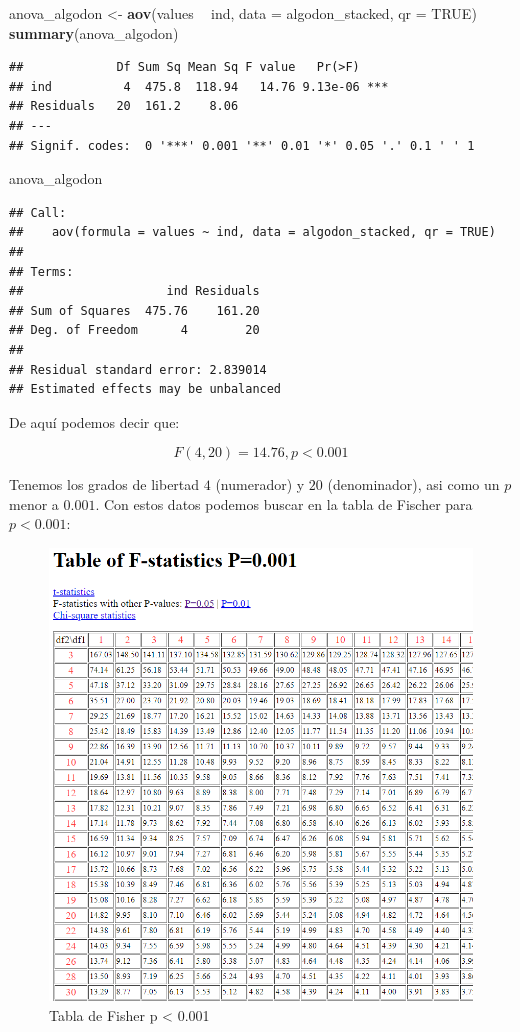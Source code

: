 \documentclass[]{article}
\newenvironment{Shaded}{\begin{snugshade}}{\end{snugshade}}
\newcommand{\KeywordTok}[1]{\textcolor[rgb]{0.13,0.29,0.53}{\textbf{#1}}}
\newcommand{\DataTypeTok}[1]{\textcolor[rgb]{0.13,0.29,0.53}{#1}}
\newcommand{\StringTok}[1]{\textcolor[rgb]{0.31,0.60,0.02}{#1}}
\newcommand{\OtherTok}[1]{\textcolor[rgb]{0.56,0.35,0.01}{#1}}
\newcommand{\OperatorTok}[1]{\textcolor[rgb]{0.81,0.36,0.00}{\textbf{#1}}}
\newcommand{\NormalTok}[1]{#1}
\begin{document}
\begin{Shaded}
\begin{Highlighting}[]
\NormalTok{anova_algodon <-}\StringTok{ }\KeywordTok{aov}\NormalTok{(values }\OperatorTok{~}\StringTok{ }\NormalTok{ind, }\DataTypeTok{data =}\NormalTok{ algodon_stacked, }\DataTypeTok{qr =} \OtherTok{TRUE}\NormalTok{)}
\KeywordTok{summary}\NormalTok{(anova_algodon)}
\end{Highlighting}
\end{Shaded}

\begin{verbatim}
##             Df Sum Sq Mean Sq F value   Pr(>F)    
## ind          4  475.8  118.94   14.76 9.13e-06 ***
## Residuals   20  161.2    8.06                     
## ---
## Signif. codes:  0 '***' 0.001 '**' 0.01 '*' 0.05 '.' 0.1 ' ' 1
\end{verbatim}

\begin{Shaded}
\begin{Highlighting}[]
\NormalTok{anova_algodon}
\end{Highlighting}
\end{Shaded}

\begin{verbatim}
## Call:
##    aov(formula = values ~ ind, data = algodon_stacked, qr = TRUE)
## 
## Terms:
##                    ind Residuals
## Sum of Squares  475.76    161.20
## Deg. of Freedom      4        20
## 
## Residual standard error: 2.839014
## Estimated effects may be unbalanced
\end{verbatim}

De aquí podemos decir que:

\[F(4,20)=14.76, p < 0.001\]

Tenemos los grados de libertad \(4\) (numerador) y \(20\) (denominador),
asi como un \(p\) menor a \(0.001\). Con estos datos podemos buscar en
la tabla de Fischer para \(p<0.001\): \renewcommand{\figurename}{Fig.}

\begin{figure}[H]

{\centering \includegraphics[width=0.7\linewidth]{ftable001} 

}

\caption{Tabla de Fisher p < 0.001}\label{fig:unnamed-chunk-9}
\end{figure}
\end{document}
